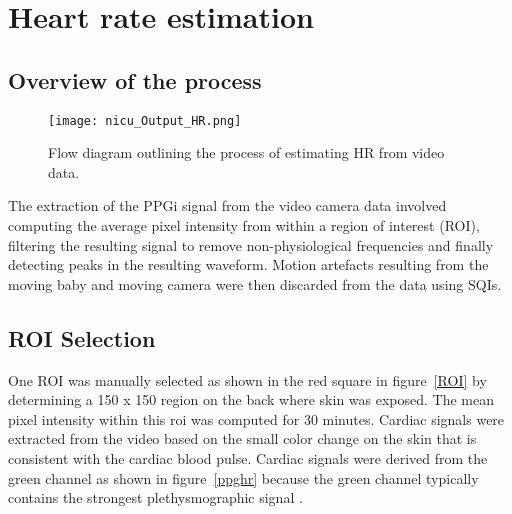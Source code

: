 \section{Heart rate estimation}
\iffalse
\label{HR methodology}
The chapter is structured as follows: ~\ref{HRflow} outlines the overall methodology for heart rate estimation. Section~\ref{roi exp} explains Region of Interest selection for signal extraction. Section~\ref{filter exp} presents the filters used to process the extracted signals, while section ~\ref{peaks expl HR} explains algorithms used for peak detection. The filters used are different to those in Chapter 3 because young pre-term infants have higher HRs compared to healthy adults.  Section~\ref{sqis expl} discusses the different SQIs used to discard noisy data and~\ref{HRresults} discusses the results for HR estimation from PPGi.
 \fi
 
\subsection{Overview of the process}
\iffalse
This section describes the extraction of a photoplethysmographic imaging (PPGi) signal from the video data and the computation of heart rate estimates from this signal using a methodology outlined in figure~\ref{HRflow}.
\fi

\begin{center}
\begin{figure}[H]
\centering
\texttt{[image: nicu\_Output\_HR.png]}
    \caption[Flow diagram outlining the process of estimating HR from a video data.]{Flow diagram outlining the process of estimating HR from video data.}
    \label{HRflow}
    \end{figure}
 \end{center}
 
The extraction of the PPGi signal from the video camera data involved computing the average pixel intensity from within a region of interest (ROI), filtering the resulting signal to remove non-physiological frequencies and finally detecting peaks in the resulting waveform. 
 Motion artefacts resulting from the moving baby and moving camera were then discarded from the data using SQIs. 
 
\subsection{ROI Selection}
\label{roi exp}
One ROI was manually selected as shown in the red square in figure~\ref{ROI} by determining a 150 x 150 region on the back where skin was exposed. The mean pixel intensity within this \gls{roi} was computed for 30 minutes. Cardiac signals were extracted from the video based on the small color change on the skin that is consistent with the cardiac blood pulse. Cardiac signals were derived from the green channel as shown in figure~\ref{ppghr} because the green channel typically contains the strongest plethysmographic signal \cite{verkruysse2008remote}. 

